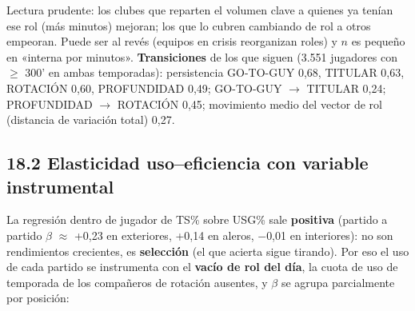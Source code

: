 \documentclass[10pt,a4paper]{article}
\begin{document}
\begin{center}\small
{}
\end{center}
Lectura prudente: los clubes que reparten el volumen clave a quienes ya tenían ese rol (más minutos) mejoran; los que lo cubren cambiando de rol a otros empeoran. Puede ser al revés (equipos en crisis reorganizan roles) y $n$ es pequeño en «interna por minutos». \textbf{Transiciones} de los que siguen (3.551 jugadores con \ensuremath{\geq} 300' en ambas temporadas): persistencia GO-TO-GUY 0,68, TITULAR 0,63, ROTACIÓN 0,60, PROFUNDIDAD 0,49; GO-TO-GUY \ensuremath{\to} TITULAR 0,24; PROFUNDIDAD \ensuremath{\to} ROTACIÓN 0,45; movimiento medio del vector de rol (distancia de variación total) 0,27.

\subsection*{18.2 Elasticidad uso--eficiencia con variable instrumental}
La regresión dentro de jugador de TS\% sobre USG\% sale \textbf{positiva} (partido a partido \ensuremath{\beta} \ensuremath{\approx} +0,23 en exteriores, +0,14 en aleros, \ensuremath{-}0,01 en interiores): no son rendimientos crecientes, es \textbf{selección} (el que acierta sigue tirando). Por eso el uso de cada partido se instrumenta con el \textbf{vacío de rol del día}, la cuota de uso de temporada de los compañeros de rotación ausentes, y $\beta$ se agrupa parcialmente por posición:
\end{document}
